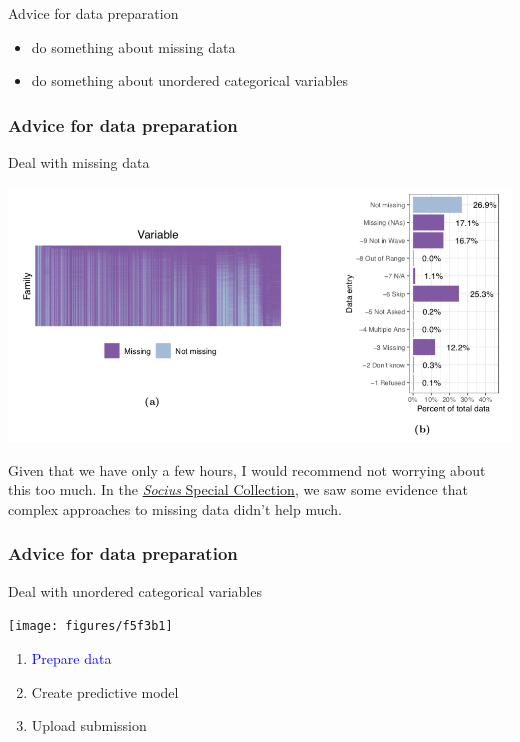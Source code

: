 \documentclass[aspectratio=169]{beamer}
\begin{document}
\begin{frame}

Advice for data preparation
\begin{itemize}
\item do something about missing data
\item do something about unordered categorical variables
\end{itemize}

\end{frame}
\begin{frame}
\frametitle{Advice for data preparation}

Deal with missing data

\begin{center}
\includegraphics[width = \textwidth]{figures/salganik_measuring_2020_figs1}
\end{center}

\vfill
Given that we have only a few hours, I would recommend not worrying about this too much.  In the \href{https://journals.sagepub.com/topic/collections-srd/srd-1-fragile_families/srd}{\textit{Socius} Special Collection}, we saw some evidence that complex approaches to missing data didn't help much.
\end{frame}
\begin{frame}
\frametitle{Advice for data preparation}

Deal with unordered categorical variables

\begin{center}
\texttt{[image: figures/f5f3b1]}
\end{center}

\end{frame}
\begin{frame}

\begin{enumerate}
\item \textcolor{blue}{Prepare data}
\item Create predictive model
\item Upload submission
\end{enumerate}

\end{frame}
\end{document}
